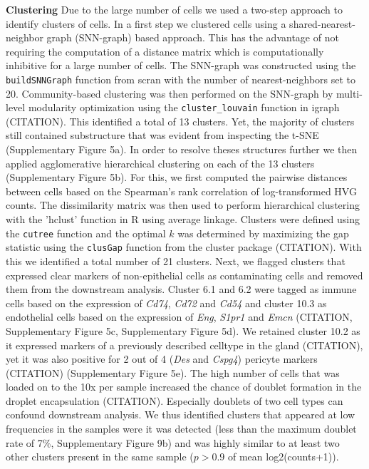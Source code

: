 \documentclass[titlepage, 12pt, oneside]{amsart}
\begin{document}
\textbf{Clustering}
Due to the large number of cells we used a two-step approach to identify clusters of cells.
In a first step we clustered cells using a shared-nearest-neighbor graph (SNN-graph) based approach.
This has the advantage of not requiring the computation of a distance matrix which is computationally inhibitive for a large number of cells.
The SNN-graph was constructed using the \texttt{buildSNNGraph} function from scran with the number of nearest-neighbors set to 20.
Community-based clustering was then performed on the SNN-graph by multi-level modularity optimization using the \texttt{cluster\_louvain} function in igraph (CITATION).
This identified a total of 13 clusters.
Yet, the majority of clusters still contained substructure that was evident from inspecting the t-SNE (Supplementary Figure 5a).
In order to resolve theses structures further we then applied agglomerative hierarchical clustering on each of the 13 clusters (Supplementary Figure 5b).
For this, we first computed the pairwise distances between cells based on the Spearman's rank correlation of log-transformed HVG counts.
The dissimilarity matrix was then used to perform hierarchical clustering with the 'hclust' function in R using average linkage.
Clusters were defined using the \texttt{cutree} function and the optimal $k$ was determined by maximizing the gap statistic using the \texttt{clusGap} function from the cluster package (CITATION).
With this we identified a total number of 21 clusters.
Next, we flagged clusters that expressed clear markers of non-epithelial cells as contaminating cells and removed them from the downstream analysis.
Cluster 6.1 and 6.2 were tagged as immune cells based on the expression of \textit{Cd74}, \textit{Cd72} and \textit{Cd54}\autocite{Scheele2017} and cluster 10.3 as endothelial cells based on the expression of \textit{Eng}, \textit{S1pr1} and \textit{Emcn} (CITATION, Supplementary Figure 5c, Supplementary Figure 5d).
We retained cluster 10.2 as it expressed markers of a previously described celltype in the gland (CITATION), yet it was also positive for 2 out of 4 (\textit{Des} and \textit{Cspg4}) pericyte markers (CITATION) (Supplementary Figure 5e).
The high number of cells that was loaded on to the 10x per sample increased the chance of doublet formation in the droplet encapsulation (CITATION).
Especially doublets of two cell types can confound downstream analysis.
We thus identified clusters that appeared at low frequencies in the samples were it was detected (less than the maximum doublet rate of 7\%, Supplementary Figure 9b) and was highly similar to at least two other clusters present in the same sample ($p > 0.9$ of mean log2(counts+1)).
\end{document}
